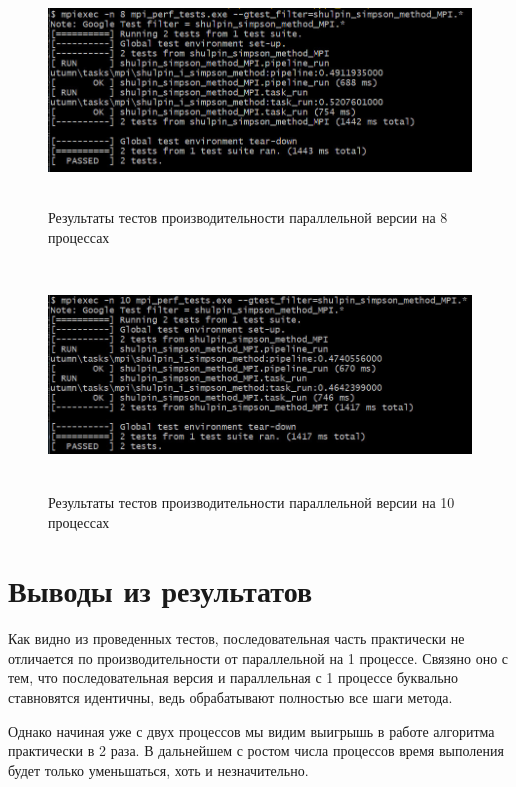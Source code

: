 \documentclass[12pt,a4paper]{article}
\begin{document}
\begin{figure}[H]
\centering
\includegraphics[height=6cm]{img/8nmpiperftest.jpg}
\caption{\label{fig:visualClass} Результаты тестов производительности параллельной версии на 8 процессах}
\end{figure}

\begin{figure}[H]
\centering
\includegraphics[height=6cm]{img/10nmpiperftest.jpg}
\caption{\label{fig:visualClass} Результаты тестов производительности параллельной версии на 10 процессах}
\end{figure}

\section*{Выводы из результатов}

Как видно из проведенных тестов, последовательная часть практически не отличается по производительности от параллельной на 1 процессе. Связяно оно с тем, что последовательная версия и параллельная с 1 процессе буквально ставновятся идентичны, ведь обрабатывают полностью все шаги метода.

Однако начиная уже с двух процессов мы видим выигрышь в работе алгоритма практически в 2 раза. В дальнейшем с ростом числа процессов время выполения будет только уменьшаться, хоть и незначительно.
\end{document}
